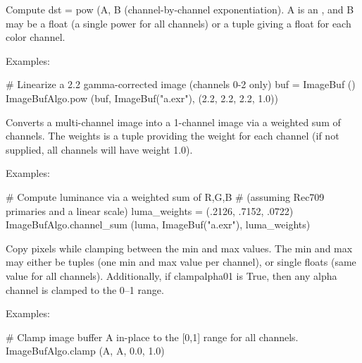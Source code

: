  

\NEW %
Compute {\cf dst} = {\cf pow (A, B} (channel-by-channel exponentiation).
{\cf A} is an \ImageBuf, and {\cf B} may be a {\cf float} (a single power
for all channels) or a tuple giving a {\cf float} for each color channel.

\smallskip
\noindent Examples:
\begin{code}
    # Linearize a 2.2 gamma-corrected image (channels 0-2 only)
    buf = ImageBuf ()
    ImageBufAlgo.pow (buf, ImageBuf("a.exr"), (2.2, 2.2, 2.2, 1.0))
\end{code}
\apiend


 
Converts a multi-channel image into a 1-channel image via a weighted sum
of channels. The {\cf weights} is a tuple providing the weight for each 
channel (if not supplied, all channels will have weight 1.0).

\smallskip
\noindent Examples:
\begin{code}
    # Compute luminance via a weighted sum of R,G,B
    # (assuming Rec709 primaries and a linear scale)
    luma_weights = (.2126, .7152, .0722)
    ImageBufAlgo.channel_sum (luma, ImageBuf("a.exr"), luma_weights)
\end{code}
\apiend


 

Copy pixels while clamping
between the {\cf min} and {\cf max} values.  The {\cf min} and {\cf max}
may either be tuples (one min and max value per channel), or single
{\cf floats} (same value for all channels).  Additionally, if
{\cf clampalpha01} is {\cf True}, then any alpha 
channel is clamped to the 0--1 range.

\smallskip
\noindent Examples:
\begin{code}
    # Clamp image buffer A in-place to the [0,1] range for all channels.
    ImageBufAlgo.clamp (A, A, 0.0, 1.0)
\end{code}
\apiend


 
 

